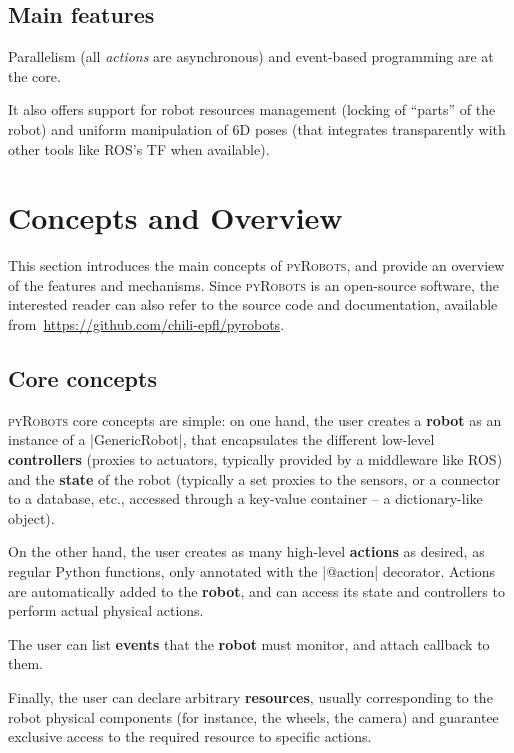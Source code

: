\documentclass[a4paper, 10pt, conference]{ieeeconf}      %
\newcommand{\pyRobots}{\textsc{pyRobots}}
\begin{document}
\subsection{Main features}

Parallelism (all \emph{actions} are asynchronous) and event-based programming
are at the core.

It also offers support for robot resources management (locking of ``parts'' of
the robot) and uniform manipulation of 6D poses (that integrates transparently
with other tools like ROS's TF when available).

\section{Concepts and Overview}

This section introduces the main concepts of \pyRobots{},
and provide an overview of the features and mechanisms. Since \pyRobots{} is an
open-source software, the interested reader can also refer to the source code
and documentation, available from~\url{https://github.com/chili-epfl/pyrobots}.

\subsection{Core concepts}

\pyRobots{} core concepts are simple: on one hand, the user creates a
\textbf{robot} as an instance of a \python|GenericRobot|, that encapsulates the
different low-level \textbf{controllers} (proxies to actuators, typically
provided by a middleware like ROS) and the \textbf{state} of the robot
(typically a set proxies to the sensors, or a connector to a database, etc.,
accessed through a key-value container -- a dictionary-like object).

On the other hand, the user creates as many high-level \textbf{actions} as
desired, as regular Python functions, only annotated with the \python|@action|
decorator. Actions are automatically added to the
\textbf{robot}, and can access its state and controllers to perform actual
physical actions.

The user can list \textbf{events} that the \textbf{robot} must monitor, and
attach callback to them.

Finally, the user can declare arbitrary \textbf{resources}, usually
corresponding to the robot physical components (for instance, the wheels, the
camera) and guarantee exclusive access to the required resource to specific
actions.
\end{document}
